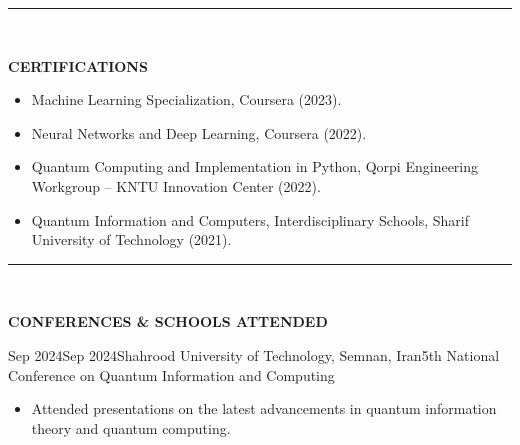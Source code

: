 \documentclass[11pt, b4paper]{cv}
\begin{document}


\vspace{-0.15in}
\rule{\textwidth}{1pt}\\
\vspace{-0.15in}

\textbf{CERTIFICATIONS}
\vspace{-0.1in}

\begin{itemize}
	\item Machine Learning Specialization, Coursera (2023).
	\item Neural Networks and Deep Learning, Coursera (2022).
	\item Quantum Computing and Implementation in Python, Qorpi Engineering Workgroup – KNTU Innovation Center (2022).
	\item Quantum Information and Computers, Interdisciplinary Schools, Sharif University of Technology (2021).
\end{itemize}

\vspace{-0.15in}
\rule{\textwidth}{1pt}\\
\vspace{-0.15in}

\textbf{CONFERENCES \& SCHOOLS ATTENDED}

\begin{school}{Sep 2024}{Sep 2024}{Shahrood University of Technology, Semnan, Iran}{5th National Conference on Quantum Information and Computing}
	\begin{itemize}
	    \item Attended presentations on the latest advancements in quantum information theory and quantum computing.
	\end{itemize}
\end{school}
\vspace{-0.1in}
\end{document}
